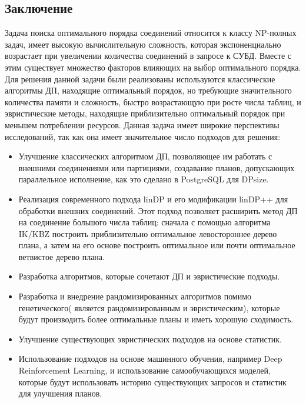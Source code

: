 \documentclass[12pt]{article}
\begin{document}
\begin{flushleft}
\centering \section*{Заключение}
\raggedright
Задача поиска оптимального порядка соединений относится к классу 
NP-полных задач, имеет высокую вычислительную сложность, которая 
экспоненциально возрастает при увеличении количества соединений в запросе 
к СУБД. Вместе с этим существует множество факторов влияющих на выбор 
оптимального порядка. Для решения данной задачи были реализованы 
используются классические алгоритмы ДП, находящие оптимальный порядок, но требующие 
значительного количества памяти и сложность, быстро возрастающую при росте числа таблиц, и эвристические методы, 
находящие приблизительно оптимальный порядок при меньшем потреблении ресурсов.
\newline
Данная задача имеет широкие перспективы исследований, так как она имеет значительное число подходов для решения:
\begin{itemize}
    \item Улучшение классических алгоритмом ДП, позволяющее им работать с внешними соединениями или партициями, создавание планов, допускающих параллельное исполнение, как это сделано в PostgreSQL для DPsize.
    \item Реализация современного подхода linDP и его модификации linDP++ для обработки внешних соединений. Этот подход позволяет расширить метод ДП на соединение большого числа таблиц: сначала с помощью алгоритма  IK/KBZ \cite{IK} \cite{KBZ} построить приблизительно оптимальное левостороннее дерево плана, а затем на его основе построить  оптимальное или почти оптимальное ветвистое дерево плана.
    \item Разработка алгоритмов, которые сочетают ДП и эвристические подходы.
    \item Разработка и внедрение рандомизированных алгоритмов помимо генетического( является рандомизированным и эвристическим), 
    которые будут производить более оптимальные планы и иметь хорошую сходимость.
    \item Улучшение существующих эвристических подходов на основе статистик.
    \item Использование подходов на основе машинного обучения, например Deep Reinforcement Learning, и использование самообучающихся моделей,
    которые будут использовать историю существующих запросов и статистик для улучшения планов.
\end{itemize}

\centering 

\raggedright

\end{flushleft}
\end{document}
